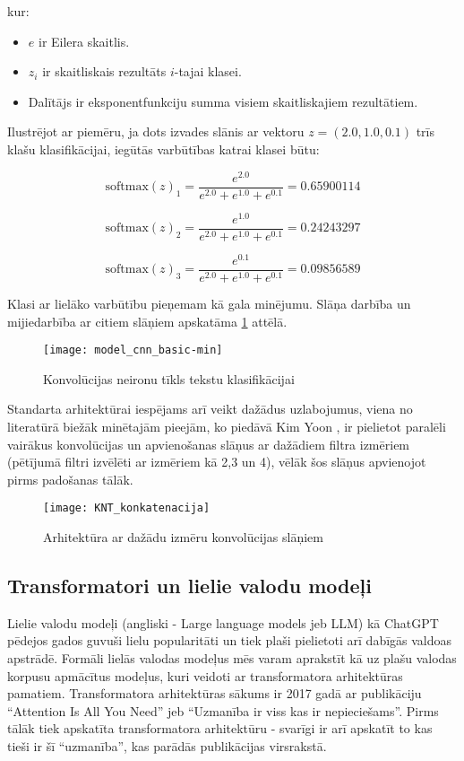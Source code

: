 \noindent kur:
\begin{itemize}
\item \(e\) ir Eilera skaitlis.
\item \(z_i\) ir skaitliskais rezultāts \(i\)-tajai klasei.
\item Dalītājs ir eksponentfunkciju summa visiem skaitliskajiem rezultātiem.
\end{itemize}

Ilustrējot ar piemēru, ja dots izvades slānis ar vektoru \(z = (2.0, 1.0, 0.1)\) trīs klašu klasifikācijai, iegūtās varbūtības katrai klasei būtu:

\[ \text{softmax}(z)_1 = \frac{e^{2.0}}{e^{2.0} + e^{1.0} + e^{0.1}} = 0.65900114\]

\[ \text{softmax}(z)_2 = \frac{e^{1.0}}{e^{2.0} + e^{1.0} + e^{0.1}} = 0.24243297\]

\[ \text{softmax}(z)_3 = \frac{e^{0.1}}{e^{2.0} + e^{1.0} + e^{0.1}} = 0.09856589\]

Klasi ar lielāko varbūtību pieņemam kā gala minējumu. Slāņa darbība un mijiedarbība ar citiem slāņiem apskatāma \ref{fig:model_cnn_basic} attēlā.

\begin{figure}[H]
	\texttt{[image: model\_cnn\_basic-min]}
	\caption{Konvolūcijas neironu tīkls tekstu klasifikācijai \cite{TextCNNLena}}
	\label{fig:model_cnn_basic}
\end{figure}

Standarta arhitektūrai iespējams arī veikt dažādus uzlabojumus, viena no literatūrā biežāk minētajām pieejām, ko piedāvā Kim Yoon \cite{kimYoonCNN}, ir pielietot paralēli vairākus konvolūcijas un apvienošanas slāņus ar dažādiem filtra izmēriem (pētījumā filtri izvēlēti ar izmēriem kā 2,3 un 4), vēlāk šos slāņus apvienojot pirms padošanas tālāk.

\begin{figure}[H]
	\texttt{[image: KNT\_konkatenacija]}
	\caption{Arhitektūra ar dažādu izmēru konvolūcijas slāņiem \cite{TextCNNLena}}
	\label{fig:KNT_konkatenacija}
\end{figure}

\subsection{Transformatori un lielie valodu modeļi}
Lielie valodu modeļi (angliski - Large language models jeb LLM) kā ChatGPT pēdejos gados guvuši lielu popularitāti un tiek plaši pielietoti arī dabīgās valdoas apstrādē. Formāli lielās valodas modeļus mēs varam aprakstīt kā uz plašu valodas korpusu apmācītus modeļus, kuri veidoti ar transformatora arhitektūras pamatiem. Transformatora arhitektūras sākums ir 2017 gadā ar publikāciju “Attention Is All You Need” \cite{vaswani2023attention} jeb “Uzmanība ir viss kas ir nepieciešams”. Pirms tālāk tiek apskatīta transformatora arhitektūru - svarīgi ir arī apskatīt to kas tieši ir šī “uzmanība”, kas parādās publikācijas virsrakstā.

